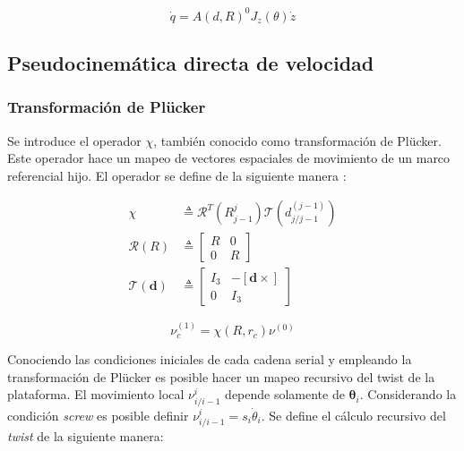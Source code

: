 \begin{equation} \label{eq: q_twist}
\dot{q} = A(d,R)^0J_z(\theta) \dot{z}
\end{equation}

\subsection{Pseudocinemática directa de velocidad}

\subsubsection{Transformación de Plücker}

Se introduce el operador $\chi$, 
también conocido como transformación de Plücker.
Este operador hace un mapeo de vectores 
espaciales de movimiento de un marco referencial hijo.
El operador se define de la siguiente manera \cite{olguin20183d}:

\begin{subequations}
 \begin{align}
  \chi & \triangleq \mathcal R^T(R_{j-1}^j) \mathcal T(d_{j/j-1}^{(j-1)})\label{eq: chi operator}\\
  \mathcal R(R) & \triangleq \begin{bmatrix}
                              R & 0\\
                              0 & R
                             \end{bmatrix}\\
  \mathcal T(\mathbf d) & \triangleq   \begin{bmatrix}
                                        I_3 & -[\mathbf d \times]\\
                                        0 & I_3
                                       \end{bmatrix}
 \end{align}
\end{subequations}

\begin{equation}\label{eq: plucker mapping}
 \nu_c^{(1)} = \chi(R, r_c) \nu^{(0)}
\end{equation}


Conociendo las condiciones iniciales de cada cadena serial
y empleando la transformación de Plücker
es posible hacer un mapeo recursivo del twist
de la plataforma.
El movimiento local 
$\nu_{i/i-1}^{i}$ depende solamente de 
$\boldsymbol \theta_i$.
Considerando la condición \emph{screw}
es posible definir 
$\nu_{i/i-1}^{i} = s_i \dot{\theta}_i$.
Se define el cálculo recursivo del \emph{twist} 
de la siguiente manera:

